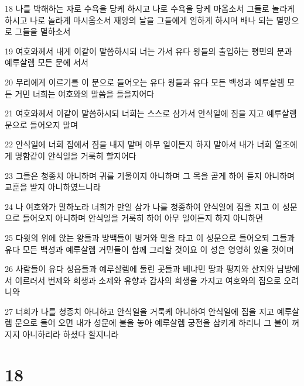 \par 18 나를 박해하는 자로 수욕을 당케 하시고 나로 수욕을 당케 마옵소서 그들로 놀라게 하시고 나로 놀라게 마시옵소서 재앙의 날을 그들에게 임하게 하시며 배나 되는 멸망으로 그들을 멸하소서
\par 19 여호와께서 내게 이같이 말씀하시되 너는 가서 유다 왕들의 출입하는 평민의 문과 예루살렘 모든 문에 서서
\par 20 무리에게 이르기를 이 문으로 들어오는 유다 왕들과 유다 모든 백성과 예루살렘 모든 거민 너희는 여호와의 말씀을 들을지어다
\par 21 여호와께서 이같이 말씀하시되 너희는 스스로 삼가서 안식일에 짐을 지고 예루살렘 문으로 들어오지 말며
\par 22 안식일에 너희 집에서 짐을 내지 말며 아무 일이든지 하지 말아서 내가 너희 열조에게 명함같이 안식일을 거룩히 할지어다
\par 23 그들은 청종치 아니하며 귀를 기울이지 아니하며 그 목을 곧게 하여 듣지 아니하며 교훈을 받지 아니하였느니라
\par 24 나 여호와가 말하노라 너희가 만일 삼가 나를 청종하여 안식일에 짐을 지고 이 성문으로 들어오지 아니하며 안식일을 거룩히 하여 아무 일이든지 하지 아니하면
\par 25 다윗의 위에 앉는 왕들과 방백들이 병거와 말을 타고 이 성문으로 들어오되 그들과 유다 모든 백성과 예루살렘 거민들이 함께 그리할 것이요 이 성은 영영히 있을 것이며
\par 26 사람들이 유다 성읍들과 예루살렘에 둘린 곳들과 베냐민 땅과 평지와 산지와 남방에서 이르러서 번제와 희생과 소제와 유향과 감사의 희생을 가지고 여호와의 집으로 오려니와
\par 27 너희가 나를 청종치 아니하고 안식일을 거룩케 아니하여 안식일에 짐을 지고 예루살렘 문으로 들어 오면 내가 성문에 불을 놓아 예루살렘 궁전을 삼키게 하리니 그 불이 꺼지지 아니하리라 하셨다 할지니라

\chapter{18}

